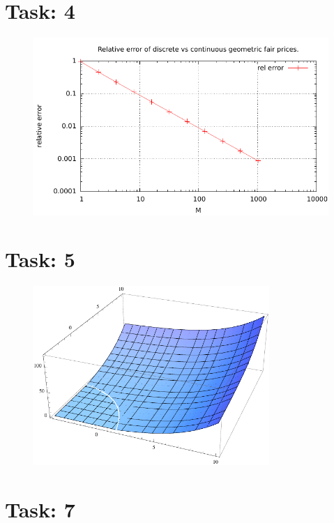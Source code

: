 \documentclass{article}
\begin{document}
\section*{Task: 4}
\begin{figure}[htbp]
  \centering
     \includegraphics[width=1.0\textwidth]{../Task04/sh3_task4_convergence_plot.pdf}
\end{figure}

\section*{Task: 5}

\begin{figure}[htbp]
  \centering
     \includegraphics[width=0.8\textwidth]{../Task05/sh3_task5_arithmetic_payoff.pdf}
\end{figure}
\newpage
\section*{Task: 7}
\end{document}
